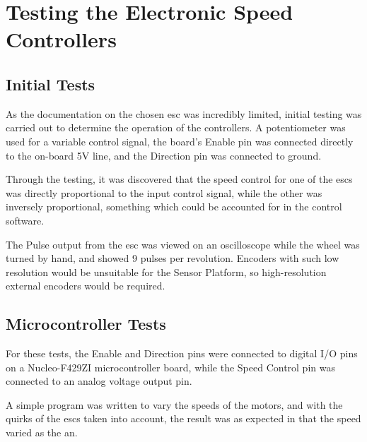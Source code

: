 \chapter{Testing the Electronic Speed Controllers}
\section{Initial Tests}
As the documentation on the chosen \gls{esc} was incredibly limited, initial testing was carried out to determine the operation of the controllers. A potentiometer was used for a variable control signal, the board's Enable pin was connected directly to the on-board 5V line, and the Direction pin was connected to ground.

Through the testing, it was discovered that the speed control for one of the \gls{esc}s was directly proportional to the input control signal, while the other was inversely proportional, something which could be accounted for in the control software.

The Pulse output from the \gls{esc} was viewed on an oscilloscope while the wheel was turned by hand, and showed 9 pulses per revolution. Encoders with such low resolution would be unsuitable for the Sensor Platform, so high-resolution external encoders would be required.

\section{Microcontroller Tests}
For these tests, the Enable and Direction pins were connected to digital I/O pins on a Nucleo-F429ZI microcontroller board, while the Speed Control pin was connected to an analog voltage output pin. 

A simple program was written to vary the speeds of the motors, and with the quirks of the \gls{esc}s taken into account, the result was as expected in that the speed varied as the an. 

